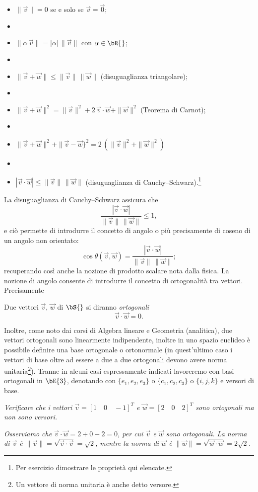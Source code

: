 \begin{proprieta}
  \begin{itemize}
    \item $\| \vec v \| = 0$ se e solo se $\vec v = \vec 0$;
    \item[]
    \item $\| \alpha\,\vec v\| = |\alpha|\, \|\vec v \|$ con $\alpha\in\bR{}$;
    \item[]
    \item $\| \vec v+\vec w \| \le \|\vec v\|\, \|\vec w\|$ (disuguaglianza 
triangolare);
    \item[]
    \item $\| \vec v+\vec w \|^2 = \|\vec v\|^2 + 2\, \vec v\cdot \vec w + 
\|\vec w\|^2$ (Teorema di Carnot);
    \item[]
    \item $\|\vec v+\vec w\|^2 + \|\vec v-\vec w\}^2 = 2\, \left(\|\vec v\|^2 
+\|\vec w\|^2 \right)$ 
    \item[]
    \item $|\vec v\cdot \vec w|\le\|\vec v\|\,\|\vec w\|$ (disuguaglianza di 
Cauchy--Schwarz).\footnote{Per esercizio dimostrare le propriet\`a qui 
elencate.}
  \end{itemize}
\end{proprieta}
La disuguaglianza di Cauchy--Schwarz assicura che
\[
  \frac{|\vec v\cdot \vec w|}{\|\vec v\|\, \|\vec w\|}\le 1,
\]
e ci\`o permette di introdurre il concetto di angolo o pi\`u precisamente 
di coseno di un angolo non orientato:
\[
  \cos\theta(\vec v,\vec w) = \frac{|\vec v\cdot \vec w|}{\|\vec v\|\, \|\vec 
w\|};
\]
recuperando cos\`{i} anche la nozione di prodotto scalare nota dalla fisica.
La nozione di angolo consente di introdurre il concetto di ortogonalit\`a tra 
vettori. Precisamente 
\begin{definition}   
  Due vettori $\vec v$, $\vec w$ di $\bS{}$ si diranno {\it ortogonali} 
  \[
    \vec v\cdot \vec w = 0.
  \]
\end{definition}  
Inoltre, come noto dai corsi di Algebra lineare e Geometria (analitica), due 
vettori 
ortogonali sono linearmente indipendente, inoltre in uno spazio euclideo \`e 
possibile
definire una base ortogonale o ortonormale (in quest'ultimo caso i vettori di 
base oltre ad
essere a due a due ortogonali devono avere norma unitaria\footnote{Un vettore 
di 
norma unitaria \`e anche detto versore.}). Tranne in alcuni 
casi espressamente indicati lavoreremo con basi ortogonali in $\bE{3}$, 
denotando con
$\{e_1,e_2,e_3\}$ o $\{c_1,c_2,c_3\}$ o $\{i,j,k\}$ e versori di base.
\begin{example}
  {\it Verificare che i vettori $\vec v= [1\quad 0 \quad -1]^T$ e $\vec w = 
[2\quad 0 \quad 2]^T$
  sono ortogonali ma non sono versori.}
\end{example}
\begin{sol}
  {\it Osserviamo che $\vec v\cdot \vec w = 2+0-2 = 0$, per cui $\vec v$ e $\vec 
w$
  sono ortogonali. La norma di $\vec v$ \`e $\|\vec v\| = \sqrt{\vec v\cdot \vec 
v} = \sqrt 2$,
  mentre la norma di $\vec w$ \`e $\|\vec w\| = \sqrt{\vec w\cdot \vec w} = 
2\sqrt 2$. } 
\end{sol}

